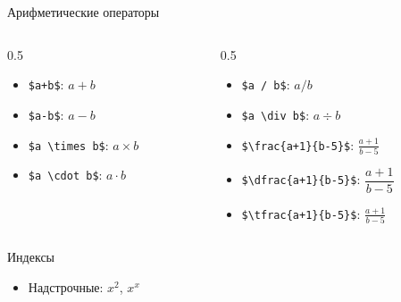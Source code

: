 \documentclass[10pt,aspectratio=169]{beamer}
\begin{document}
    \begin{frame}[fragile]{Арифметические операторы}
    	\begin{columns}
    		\begin{column}{0.5\textwidth}
		    	\begin{itemize}
    				\item \verb|$a+b$|: $a+b$
    				\item \verb|$a-b$|: $a-b$
    				\item \verb|$a \times b$|: $a \times b$
    				\item \verb|$a \cdot b$|: $a \cdot b$
    			\end{itemize}
    		\end{column}
    		\begin{column}{0.5\textwidth}
		    	\begin{itemize}
    				\item \verb|$a / b$|: $a / b$
		    		\item \verb|$a \div b$|: $a \div b$
    				\item \verb|$\frac{a+1}{b-5}$|: $\frac{a+1}{b-5}$
    				\item \verb|$\dfrac{a+1}{b-5}$|: $\dfrac{a+1}{b-5}$
    				\item \verb|$\tfrac{a+1}{b-5}$|: $\tfrac{a+1}{b-5}$
    			\end{itemize}
    		\end{column}
    	\end{columns}
    \end{frame}
    
    \begin{frame}[fragile]{Индексы}
		\begin{itemize}
			\item Надстрочные: $x^2$, $x^x$
		\end{itemize}
	\end{frame}
	
\end{document}
